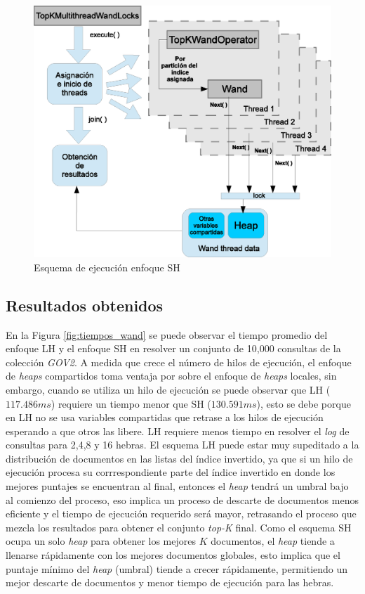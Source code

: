 \begin{figure}[th!]
\centering
\includegraphics[scale=.75]{images/ejecucion_topkmultithreadwandopCOMPARTIDO.eps}
\caption{Esquema de ejecución enfoque SH}
\label{fig:esquema_ejecucion_wandsh}
\end{figure}


\subsection{Resultados obtenidos}
\label{evaluacionexperimental:resultadosObtenidos}
En la Figura \ref{fig:tiempos_wand} se puede observar el tiempo promedio del enfoque LH y el enfoque SH en resolver un conjunto de 10,000 consultas de la colección \textit{GOV2}. A medida que crece el número de hilos de ejecución, el enfoque de \textit{heaps} compartidos toma ventaja por sobre el enfoque de \textit{heaps} locales, sin embargo, cuando se utiliza un hilo de ejecución se puede observar que LH ($117.486 ms$) requiere un tiempo menor que SH ($130.591 ms$), esto se debe porque en LH no se usa variables compartidas que retrase a los hilos de ejecución esperando a que otros las libere. LH requiere menos tiempo en resolver el \textit{log} de consultas para 2,4,8 y 16 hebras. 
El esquema LH puede estar muy supeditado a la distribución de documentos en las listas del índice invertido, ya que si un hilo de ejecución procesa su corrrespondiente parte del índice invertido en donde los mejores puntajes se encuentran al final, entonces el \textit{heap} tendrá un umbral bajo al comienzo del proceso, eso implica un proceso de descarte de documentos menos eficiente y el tiempo de ejecución requerido será mayor, retrasando el proceso que mezcla los resultados para obtener el conjunto \textit{top-K} final. 
Como el esquema SH ocupa un solo \textit{heap} para obtener los mejores $K$ documentos, el \textit{heap} tiende a llenarse rápidamente con los mejores documentos globales, esto implica que el puntaje mínimo del \textit{heap} (umbral) tiende a crecer rápidamente, permitiendo un mejor descarte de documentos y menor tiempo de ejecución para las hebras. 

